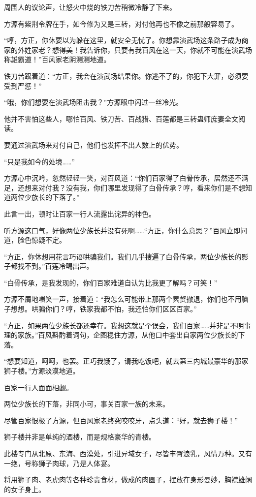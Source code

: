 \begin{this_body}
周围人的议论声，让怒火中烧的铁刀苦稍微冷静了下来。

方源有紫荆令牌在手，如今修为又是三转，对付他再也不像之前那般容易了。

“哼，方正，你休要以为躲在这里，就安全无忧了。你想靠演武场这条路子成为商家的外姓家老？想得美！我告诉你，只要有我百风在这一天，你就不可能在演武场称雄霸道！”百风家老阴测测地道。

铁刀苦跟着道：“方正，我会在演武场结果你。你逃不了的，你犯下大罪，必须要受到严惩！”

“哦，你们想要在演武场阻击我？”方源眼中闪过一丝冷光。

他并不害怕这些人，哪怕百风、铁刀苦、百战猎、百莲都是三转蛊师庶妻全文阅读。

要通过演武场来对付自己，他们也发挥不出人数上的优势。

“只是我如今的处境……”

方源心中沉吟，忽然轻轻一笑，对百风道：“你们百家得了白骨传承，居然还不满足，还想来对付我？没有我，你们哪里发现得了白骨传承？哼，看来你们是不想知道两位少族长的下落了。”

此言一出，顿时让百家一行人流露出诧异的神色。

听方源这口气，好像两位少族长并没有死啊……“方正，你什么意思？”百风立即问道，脸色惊疑不定。

“方正，你休想用花言巧语哄骗我们。我们几乎搜遍了白骨传承，两位少族长的影子都找不到。”百莲冷喝出声。

“白骨传承，是我发现的，你们百家难道自认为比我更了解吗？可笑！”

方源不屑地嗤笑一声，接着道：“我怎么可能带上那两个累赘撤退，你们也不用脑子想想。哄骗你们？哼，铁家我都不怕，我还怕你们区区百家。”

“方正，如果两位少族长都还幸存。我想这就是个误会，我们百家……并非是不明事理的家族。”百风斟酌着词句，企图稳住方源，从他口中套出自家两位少族长的下落。

“想要知道，呵呵，也罢。正巧我饿了，请我吃饭吧，就去第三内城最豪华的那家狮子楼。”方源淡漠地道。

百家一行人面面相觑。

两位少族长的下落，非同小可，事关百家一族的未来。

尽管百家恨极了方源，但百风家老终究咬咬牙，点头道：“好，就去狮子楼！”

狮子楼并非是单纯的酒楼，而是规格豪华的青楼。

此楼专门从北原、东海、西漠处，引进异域女子，尽皆丰臀浪乳，风情万种。又有一绝，号称狮子肉球，乃是人体宴。

将用狮子肉、老虎肉等各种珍贵食材，做成的肉圆子，摆放在身形曼妙，胸襟雄阔的女子身上。


\end{this_body}
